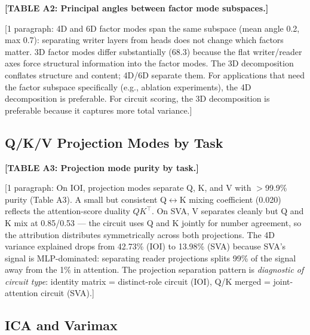 \documentclass[11pt]{article}
\begin{document}
\textbf{[TABLE A2: Principal angles between factor mode subspaces.]}

[1 paragraph: 4D and 6D factor modes span the same subspace (mean angle
0.2\textdegree, max 0.7\textdegree): separating writer layers from heads
does not change which factors matter. 3D factor modes differ substantially
(68.3\textdegree) because the flat writer/reader axes force structural
information into the factor modes. The 3D decomposition conflates
structure and content; 4D/6D separate them. For applications that need
the factor subspace specifically (e.g., ablation experiments), the 4D
decomposition is preferable. For circuit scoring, the 3D decomposition is
preferable because it captures more total variance.]

\subsection{Q/K/V Projection Modes by Task}

\textbf{[TABLE A3: Projection mode purity by task.]}

[1 paragraph: On IOI, projection modes separate Q, K, and V with
$>$99.9\% purity (Table A3). A small but consistent Q$\leftrightarrow$K
mixing coefficient (0.020) reflects the attention-score duality $QK^\top$.
On SVA, V separates cleanly but Q and K mix at 0.85/0.53 --- the circuit
uses Q and K jointly for number agreement, so the attribution distributes
symmetrically across both projections. The 4D variance explained drops
from 42.73\% (IOI) to 13.98\% (SVA) because SVA's signal is
MLP-dominated: separating reader projections splits 99\% of the signal
away from the 1\% in attention. The projection separation pattern is
\emph{diagnostic of circuit type}: identity matrix = distinct-role
circuit (IOI), Q/K merged = joint-attention circuit (SVA).]

\subsection{ICA and Varimax}
\end{document}
